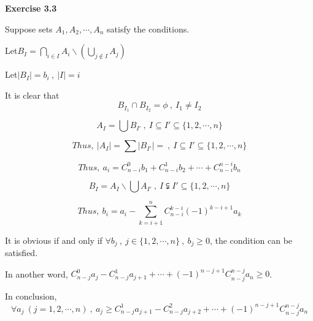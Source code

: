 \documentclass{article} %
\begin{document}
	\textbf{Exercise 3.3}\par
	Suppose sets $A_1,A_2,\cdots,A_n$ satisfy the conditions.\par
	Let$B_I=\bigcap_{i\in I}A_i \backslash (\bigcup_{j\notin I} A_j)$\par
	Let$|B_I|=b_i\ ,\ |I|=i$\par
	It is clear that
	$$B_{I_1}\cap B_{I_2}=\phi\ ,\ I_1\neq I_2$$

	$$A_I=\bigcup B_{I'}\ ,\ I\subseteq I'\subseteq \{1,2,\cdots ,n\}$$

	$$Thus,\ |A_I|=\sum |B_{I'}|=\ ,\ I\subseteq I'\subseteq \{1,2,\cdots ,n\}$$

	$$Thus,\ a_i=C^0_{n-i}b_1+C^1_{n-i}b_2+\cdots +C^{n-i}_{n-i}b_n$$

	$$B_I=A_I\backslash \bigcup A_{I'}\ ,\ I\subsetneqq I'\subseteq \{1,2,\cdots ,n\}$$

	$$Thus,\ b_i=a_i-\sum^n_{k=i+1} C^{k-i}_{n-i}(-1)^{k-i+1}a_k$$

	It is obvious if and only if $\forall b_j\ ,\ j\in \{1,2,\cdots,n\}\ ,\ b_j\geq 0$, the condition can be satisfied.\par

	In another word, $C^0_{n-j}a_j-C^1_{n-j}a_{j+1}+\cdots +(-1)^{n-j+1}C^{n-j}_{n-j}a_n\geq 0$.\par
	
	In conclusion, $$\forall a_j\ (j=1,2,\cdots,n)\ ,\ a_j\geq C^1_{n-j}a_{j+1}-C^2_{n-j}a_{j+2}+\cdots +(-1)^{n-j+1}C^{n-j}_{n-j}a_n$$
	
\end{document}
